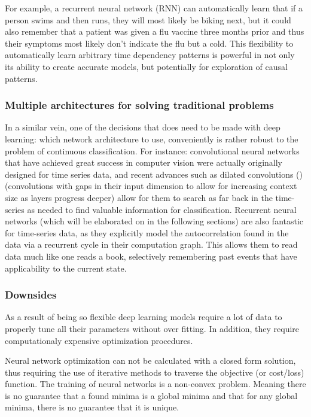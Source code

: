 \documentclass[]{book}
\theoremstyle{definition}
\theoremstyle{definition}
\theoremstyle{definition}
\theoremstyle{remark}
\begin{document}
For example, a recurrent neural network (RNN) can automatically learn
that if a person swims and then runs, they will most likely be biking
next, but it could also remember that a patient was given a flu vaccine
three months prior and thus their symptoms most likely don't indicate
the flu but a cold. This flexibility to automatically learn arbitrary
time dependency patterns is powerful in not only its ability to create
accurate models, but potentially for exploration of causal patterns.

\subsubsection{Multiple architectures for solving traditional
problems}\label{multiple-architectures-for-solving-traditional-problems}

In a similar vein, one of the decisions that does need to be made with
deep learning: which network architecture to use, conveniently is rather
robust to the problem of continuous classification. For instance:
convolutional neural networks that have achieved great success in
computer vision were actually originally designed for time series data,
and recent advances such as dilated convolutions
(\citet{dilated_convolutions})(convolutions with gaps in their input
dimension to allow for increasing context size as layers progress
deeper) allow for them to search as far back in the time-series as
needed to find valuable information for classification. Recurrent neural
networks (which will be elaborated on in the following sections) are
also fantastic for time-series data, as they explicitly model the
autocorrelation found in the data via a recurrent cycle in their
computation graph. This allows them to read data much like one reads a
book, selectively remembering past events that have applicability to the
current state.

\subsubsection{Downsides}\label{downsides}

As a result of being so flexible deep learning models require a lot of
data to properly tune all their parameters without over fitting. In
addition, they require computationaly expensive optimization procedures.

Neural network optimization can not be calculated with a closed form
solution, thus requiring the use of iterative methods to traverse the
objective (or cost/loss) function. The training of neural networks is a
non-convex problem. Meaning there is no guarantee that a found minima is
a global minima and that for any global minima, there is no guarantee
that it is unique.
\end{document}
